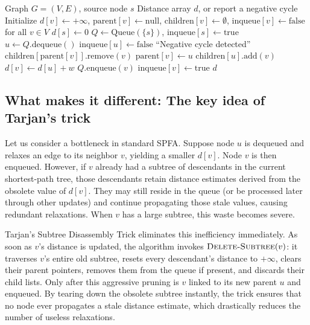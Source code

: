 \documentclass[a4paper]{article}
\theoremstyle{definition}
\begin{document}
\begin{algorithm}[H]
\caption{SPFA with Tarjan's Subtree Disassembly Trick}
\label{alg:spfa-tarjan}
\begin{algorithmic}[1]
\Require Graph $G = (V, E)$, source node $s$
\Ensure Distance array $d$, or report a negative cycle
\State Initialize $d[v] \gets +\infty$, $\text{parent}[v] \gets \text{null}$, $\text{children}[v] \gets \emptyset$, $\text{inqueue}[v] \gets \text{false}$ for all $v \in V$
\State $d[s] \gets 0$
\State $Q \gets \text{Queue}(\{s\})$, $\text{inqueue}[s] \gets \text{true}$
    \State $u \gets Q.\text{dequeue}()$
    \State $\text{inqueue}[u] \gets \text{false}$
                \State \Return ``Negative cycle detected''
            \EndIf
            \State {}
                \State $\text{children}[\text{parent}[v]].\text{remove}(v)$
            \EndIf
            \State $\text{parent}[v] \gets u$
            \State $\text{children}[u].\text{add}(v)$
            \State $d[v] \gets d[u] + w$
                \State $Q.\text{enqueue}(v)$
                \State $\text{inqueue}[v] \gets \text{true}$
            \EndIf
        \EndIf
    \EndFor
\EndWhile
\State \Return $d$
\end{algorithmic}
\end{algorithm}


\subsection{What makes it different: The key idea of Tarjan's trick} 

Let us consider a bottleneck in standard SPFA. Suppose node $u$ is dequeued and relaxes an edge to its neighbor $v$, yielding a smaller $d[v]$. Node $v$ is then enqueued. However, if $v$ already had a subtree of descendants in the current shortest-path tree, those descendants retain distance estimates derived from the obsolete value of $d[v]$. They may still reside in the queue (or be processed later through other updates) and continue propagating those stale values, causing redundant relaxations. When $v$ has a large subtree, this waste becomes severe.

Tarjan's Subtree Disassembly Trick eliminates this inefficiency immediately. As soon as $v$'s distance is updated, the algorithm invokes $\textsc{Delete-Subtree}(v)$: it traverses $v$'s entire old subtree, resets every descendant's distance to $+\infty$, clears their parent pointers, removes them from the queue if present, and discards their child lists. Only after this aggressive pruning is $v$ linked to its new parent $u$ and enqueued. By tearing down the obsolete subtree instantly, the trick ensures that no node ever propagates a stale distance estimate, which drastically reduces the number of useless relaxations. 
\end{document}
